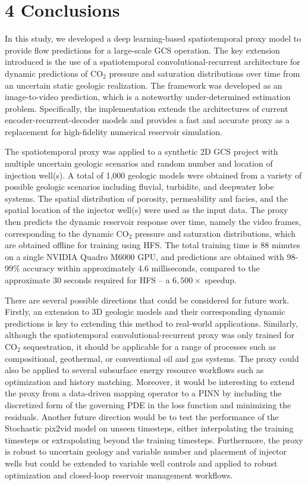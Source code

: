 \documentclass[10pt, twoside]{article}
\begin{document}
\section*{\textbf{4 Conclusions}}

In this study, we developed a deep learning-based spatiotemporal proxy model to provide flow predictions for a large-scale GCS operation. The key extension introduced is the use of a spatiotemporal convolutional-recurrent architecture for dynamic predictions of CO$_2$ pressure and saturation distributions over time from an uncertain static geologic realization. The framework was developed as an image-to-video prediction, which is a noteworthy under-determined estimation problem. Specifically, the implementation extends the architectures of current encoder-recurrent-decoder models and provides a fast and accurate proxy as a replacement for high-fidelity numerical reservoir simulation.

The spatiotemporal proxy was applied to a synthetic 2D GCS project with multiple uncertain geologic scenarios and random number and location of injection well(s). A total of 1,000 geologic models were obtained from a variety of possible geologic scenarios including fluvial, turbidite, and deepwater lobe systems. The spatial distribution of porosity, permeability and facies, and the spatial location of the injector well(s) were used as the input data. The proxy then predicts the dynamic reservoir response over time, namely the video frames, corresponding to the dynamic CO$_2$ pressure and saturation distributions, which are obtained offline for training using HFS. The total training time is 88 minutes on a single NVIDIA Quadro M6000 GPU, and predictions are obtained with 98-99\% accuracy within approximately 4.6 milliseconds, compared to the approximate 30 seconds required for HFS – a $6,500\times$ speedup. 

There are several possible directions that could be considered for future work. Firstly, an extension to 3D geologic models and their corresponding dynamic predictions is key to extending this method to real-world applications. Similarly, although the spatiotemporal convolutional-recurrent proxy was only trained for CO$_2$ sequestration, it should be applicable for a range of processes such as compositional, geothermal, or conventional oil and gas systems. The proxy could also be applied to several subsurface energy resource workflows such as optimization and history matching. Moreover, it would be interesting to extend the proxy from a data-driven mapping operator to a PINN by including the discretized form of the governing PDE in the loss function and minimizing the residuals. Another future direction would be to test the performance of the Stochastic pix2vid model on unseen timesteps, either interpolating the training timesteps or extrapolating beyond the training timesteps. Furthermore, the proxy is robust to uncertain geology and variable number and placement of injector wells but could be extended to variable well controls and applied to robust optimization and closed-loop reservoir management workflows. 
\end{document}
